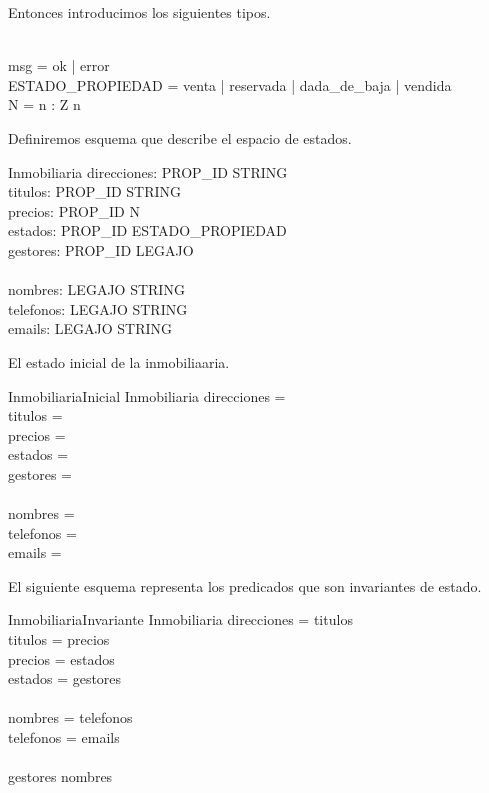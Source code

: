 \documentclass[12pt]{article}
\begin{document}
Entonces introducimos los siguientes tipos.

\begin{zed}
\\
msg = ok | error\\
ESTADO\_PROPIEDAD = venta | reservada | dada\_de\_baja | vendida\\
N = {n : Z  \leq n}
\end{zed}

Definiremos esquema que describe el espacio de estados.

\begin{schema}{Inmobiliaria}
direcciones: PROP\_ID \pfun STRING \\
titulos: PROP\_ID \pfun STRING \\
precios: PROP\_ID \pfun N \\
estados: PROP\_ID \pfun ESTADO\_PROPIEDAD \\
gestores: PROP\_ID \pfun LEGAJO \\
\ \\
nombres: LEGAJO \pfun STRING \\
telefonos: LEGAJO \pfun STRING \\
emails: LEGAJO \pfun STRING \\
\end{schema}

El estado inicial de la inmobiliaaria.

\begin{schema}{InmobiliariaInicial}
Inmobiliaria
\where
direcciones =  \emptyset  \\
titulos =  \emptyset  \\
precios =  \emptyset  \\
estados =  \emptyset  \\
gestores =  \emptyset  \\
\ \\
nombres =  \emptyset  \\
telefonos =  \emptyset  \\
emails =  \emptyset  \\
\end{schema}

El siguiente esquema representa los predicados que son invariantes de estado.

\begin{schema}{InmobiliariaInvariante}
Inmobiliaria
\where
\dom direcciones = \dom titulos \\
\dom titulos = \dom precios \\
\dom precios = \dom estados \\
\dom estados = \dom gestores \\
\ \\
\dom nombres = \dom telefonos \\
\dom telefonos = \dom emails \\
\ \\
\ran gestores \subseteq \dom nombres \\
\end{schema}
\end{document}
